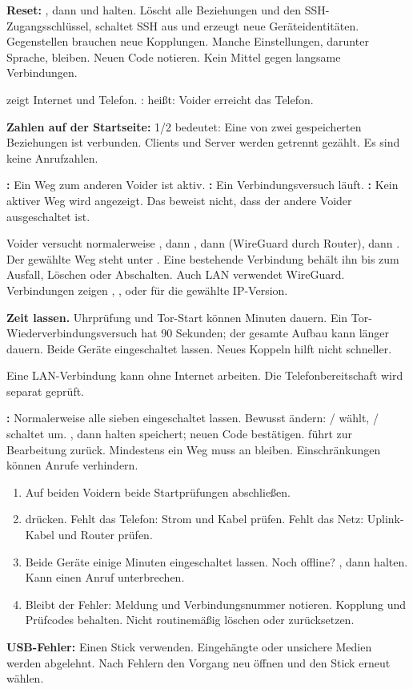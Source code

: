 \textbf{Reset:}  \arr {} \arr {} \arr {}, dann  und  halten. Löscht alle Beziehungen und den SSH-Zugangsschlüssel, schaltet SSH aus und erzeugt neue Geräteidentitäten. Gegenstellen brauchen neue Kopplungen. Manche Einstellungen, darunter Sprache, bleiben. Neuen Code notieren. Kein Mittel gegen langsame Verbindungen.

 zeigt Internet und Telefon. :  heißt: Voider erreicht das Telefon.

\textbf{Zahlen auf der Startseite:} 1/2 bedeutet: Eine von zwei gespeicherten Beziehungen ist verbunden. Clients und Server werden getrennt gezählt. Es sind keine Anrufzahlen.

\textbf{:} Ein Weg zum anderen Voider ist aktiv. \textbf{:} Ein Verbindungsversuch läuft. \textbf{:} Kein aktiver Weg wird angezeigt. Das beweist nicht, dass der andere Voider ausgeschaltet ist.

Voider versucht normalerweise , dann , dann  (WireGuard durch Router), dann . Der gewählte Weg steht unter . Eine bestehende Verbindung behält ihn bis zum Ausfall, Löschen oder Abschalten. Auch LAN verwendet WireGuard. Verbindungen zeigen , ,  oder  für die gewählte IP-Version.

\textbf{Zeit lassen.} Uhrprüfung und Tor-Start können Minuten dauern. Ein Tor-Wiederverbindungsversuch hat 90 Sekunden; der gesamte Aufbau kann länger dauern. Beide Geräte eingeschaltet lassen. Neues Koppeln hilft nicht schneller.

Eine LAN-Verbindung kann ohne Internet arbeiten. Die Telefonbereitschaft wird separat geprüft.

\textbf{:} Normalerweise alle sieben eingeschaltet lassen. Bewusst ändern: / wählt, / schaltet um. , dann  halten speichert; neuen Code bestätigen.  führt zur Bearbeitung zurück. Mindestens ein Weg muss an bleiben. Einschränkungen können Anrufe verhindern.

\begin{enumerate}
\item Auf beiden Voidern beide Startprüfungen abschließen.
\item {} drücken. Fehlt das Telefon: Strom und Kabel prüfen. Fehlt das Netz: Uplink-Kabel und Router prüfen.
\item Beide Geräte einige Minuten eingeschaltet lassen. Noch offline?  \arr {}, dann  halten. Kann einen Anruf unterbrechen.
\item Bleibt der Fehler: Meldung und Verbindungsnummer notieren. Kopplung und Prüfcodes behalten. Nicht routinemäßig löschen oder zurücksetzen.
\end{enumerate}
\textbf{USB-Fehler:} Einen Stick verwenden. Eingehängte oder unsichere Medien werden abgelehnt. Nach Fehlern den Vorgang neu öffnen und den Stick erneut wählen.


